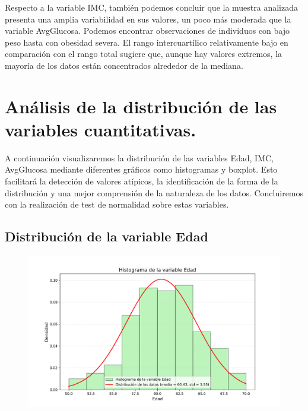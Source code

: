 \documentclass[a4paper, 12pt]{article}
\begin{document}
Respecto a la variable IMC, también podemos concluir que la muestra analizada presenta una amplia variabilidad en sus valores, un poco más moderada que la variable AvgGlucosa. Podemos encontrar observaciones 
de individuos con bajo peso hasta con obesidad severa. El rango intercuartílico relativamente bajo en comparación 
con el rango total sugiere que, aunque hay valores extremos, la mayoría de los datos están concentrados alrededor de la 
mediana.




\newpage



\section{Análisis de la distribución de las variables cuantitativas.}
A continuación visualizaremos la distribución de las variables Edad, IMC, AvgGlucosa mediante diferentes gráficos como histogramas y boxplot.
Esto facilitará la detección de valores atípicos, la identificación de la forma de la distribución y una mejor comprensión de la naturaleza 
de los datos. Concluiremos con la realización de test de normalidad sobre estas variables.


\subsection{Distribución de la variable Edad}
\vspace {-0.8cm}
\begin{figure}[H]
    \centering
    \includegraphics[width=1\textwidth]{img/Histogramas/Histograma_Edad.png}
\end{figure}
\end{document}
